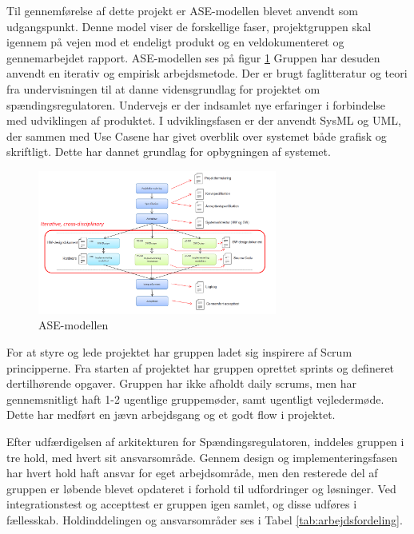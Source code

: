 
Til gennemførelse af dette projekt er ASE-modellen blevet anvendt som udgangspunkt. Denne model viser de forskellige faser, projektgruppen skal igennem på vejen mod et endeligt produkt og en veldokumenteret og gennemarbejdet rapport. ASE-modellen ses på figur \ref{fig:Asemodel} Gruppen har desuden anvendt en iterativ og empirisk arbejdsmetode. Der er brugt faglitteratur og teori fra undervisningen til at danne vidensgrundlag for projektet om spændingsregulatoren. Undervejs er der indsamlet nye erfaringer i forbindelse med udviklingen af produktet. 
I udviklingsfasen er der anvendt SysML og UML, der sammen med Use Casene har givet overblik over systemet både grafisk og skriftligt. Dette har dannet grundlag for opbygningen af systemet. 

\begin{figure}[H] 
	\centering
	\includegraphics[width=0.7\textwidth]{figure/Asemodel}
	\caption{ASE-modellen}
	\label{fig:Asemodel}
\end{figure}

For at styre og lede projektet har gruppen ladet sig inspirere af Scrum principperne. Fra starten af projektet har gruppen oprettet sprints og defineret dertilhørende opgaver. Gruppen har ikke afholdt daily scrums, men har gennemsnitligt haft 1-2 ugentlige gruppemøder, samt ugentligt vejledermøde. Dette har medført en jævn arbejdsgang og et godt flow i projektet. \newline

Efter udfærdigelsen af arkitekturen for Spændingsregulatoren, inddeles gruppen i tre hold, med hvert sit ansvarsområde. Gennem design og implementeringsfasen har hvert hold haft ansvar for eget arbejdsområde, men den resterede del af gruppen er løbende blevet opdateret i forhold til udfordringer og løsninger. 
Ved integrationstest og accepttest er gruppen igen samlet, og disse udføres i fællesskab. 
Holdinddelingen og ansvarsområder ses i Tabel \ref{tab:arbejdsfordeling}.

